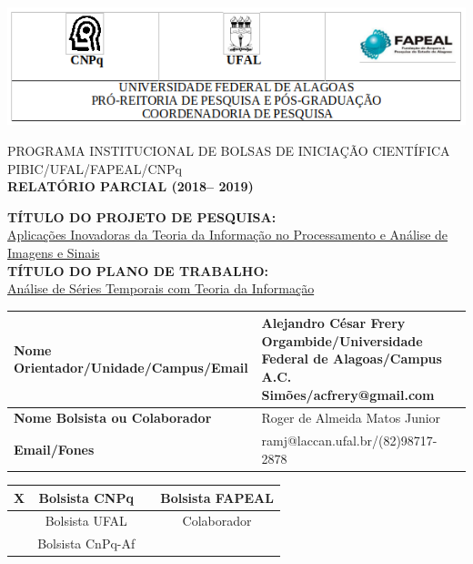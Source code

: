 \documentclass{article}
\begin{document}
\includegraphics[width=1.0\columnwidth]{tabela1.png}\\

\begin{center}
PROGRAMA INSTITUCIONAL DE BOLSAS DE INICIAÇÃO CIENTÍFICA
PIBIC/UFAL/FAPEAL/CNPq \\
\vspace{7mm}
\textbf{RELATÓRIO PARCIAL (2018– 2019)}\\
\end{center}
   
\vspace{6mm}
   
\begin{flushleft}
\textbf{TÍTULO DO PROJETO DE PESQUISA:}\\
\underline{Aplicações Inovadoras da Teoria da Informação no Processamento e Análise de Imagens e Sinais}\\
\vspace{5mm}
\textbf{TÍTULO DO PLANO DE TRABALHO:}\\
\underline{Análise de Séries Temporais com Teoria da Informação}
\vspace{5mm}
    
\begin{table}[!h]
\begin{center}
\begin{tabularx}{\textwidth}{|X|X|X|}
\hline                              
\textbf{Nome Orientador/Unidade/Campus/Email} &  Alejandro César Frery Orgambide/Universidade Federal de Alagoas/Campus A.C. Simões/acfrery@gmail.com\\
\hline     
\textbf{Nome Bolsista ou Colaborador} & Roger de Almeida Matos Junior\\
\hline     
\textbf{Email/Fones} & ramj@laccan.ufal.br/(82)98717-2878\\
\hline     
\end{tabularx}
\end{center}
\end{table}
\end{flushleft}
    
\begin{center}
\begin{tabular}{|c|c|c|c|}
\hline
X & Bolsista CNPq & & Bolsista FAPEAL\\
\hline
 & Bolsista UFAL & & Colaborador\\
\hline
 & Bolsista CnPq-Af & & \\
\hline
\end{tabular}
\end{center}
  
\end{document}

